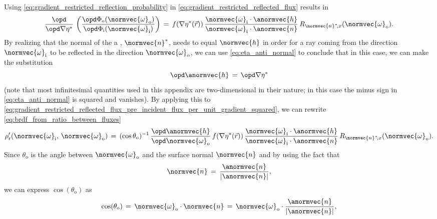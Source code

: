 Using \eqref{eq:gradient_restricted_reflection_probability} in \eqref{eq:gradient_restricted_reflected_flux} results in
%
\begin{equation} \label{eq:gradient_restricted_reflected_flux_pre_incident_flux_per_unit_gradient_squared}
\frac{\opd}{\opd \nabla\eta^*}\,\left(\frac{\opd \Phi_{\text{o}}(\normvec{\omega}_{\text{o}})}{\opd \Phi_{\text{i}}(\normvec{\omega}_{\text{i}})}\right) \,=\, f(\nabla\eta^*(\vec{r}))\,\frac{\normvec{\omega}_{\text{i}}\cdot\anormvec{h}}{\normvec{\omega}_{\text{i}}\cdot\anormvec{n}}\,R_{\normvec{n}^*\!,x}(\normvec{\omega}_{\text{o}}).
\end{equation}
%
By realizing that the normal of the a \microfacet, $\normvec{n}^*$, needs to equal $\normvec{h}$ in order for a ray coming from the direction $\normvec{\omega}_{\text{i}}$ to be reflected in the direction $\normvec{\omega}_{\text{o}}$, we can use \eqref{eq:eta_anti_normal} to conclude that in this case, we can make the substitution
%
\begin{equation}
\opd \anormvec{h} \,=\, \opd\nabla\eta^*
\end{equation}
%
(note that most infinitesimal quantities used in this appendix are two-dimen\-sional in their nature; in this case the minus sign in \eqref{eq:eta_anti_normal} is squared and vanishes). By applying this to \eqref{eq:gradient_restricted_reflected_flux_pre_incident_flux_per_unit_gradient_squared}, we can rewrite  \eqref{eq:brdf_from_ratio_between_fluxes}
%
\begin{equation}  \label{eq:brdf_from_eta_gradient_distribution_cos_thetao_and_derivative}
\rho'_{\text{r}}(\normvec{\omega}_{\text{i}},\, \normvec{\omega}_{\text{o}}) \,=\, (\cos\theta_{\text{o}})^{-1}\, \frac{\opd\anormvec{h}}{\opd\normvec{\omega}_{\text{o}}}\,f(\nabla\eta^*(\vec{r}))\,\frac{\normvec{\omega}_{\text{i}}\cdot\anormvec{h}}{\normvec{\omega}_{\text{i}}\cdot\anormvec{n}}\,R_{\normvec{n}^*\!,x}(\normvec{\omega}_{\text{o}}).
\end{equation}
%
Since $\theta_{\text{o}}$ is the angle between $\normvec{\omega}_{\text{o}}$ and the surface normal $\normvec{n}$ and by using the fact that
%
\begin{equation} \label{eq:normal_from_anti_normal}
\normvec{n} \,=\, \frac{\anormvec{n}}{|\anormvec{n}|},
\end{equation}
%
we can express $\cos(\theta_{\text{o}})$ as
%
\begin{equation}
\cos(\theta_{\text{o}}) \,=\, \normvec{\omega}_{\text{o}}\cdot\normvec{n} \,=\, \normvec{\omega}_{\text{o}}\cdot\frac{\anormvec{n}}{|\anormvec{n}|},
\end{equation}

